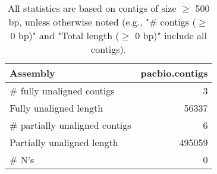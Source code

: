 \documentclass[12pt,a4paper]{article}
\begin{document}
\begin{table}[ht]
\begin{center}
\caption{All statistics are based on contigs of size $\geq$ 500 bp, unless otherwise noted (e.g., "\# contigs ($\geq$ 0 bp)" and "Total length ($\geq$ 0 bp)" include all contigs).}
\begin{tabular}{|l*{1}{|r}|}
\hline
Assembly & pacbio.contigs \\ \hline
\# fully unaligned contigs & 3 \\ \hline
Fully unaligned length & 56337 \\ \hline
\# partially unaligned contigs & 6 \\ \hline
Partially unaligned length & 495059 \\ \hline
\# N's & 0 \\ \hline
\end{tabular}
\end{center}
\end{table}
\end{document}
